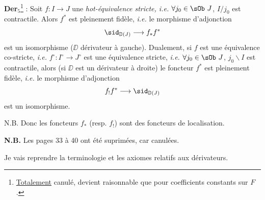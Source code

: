 \textbf{Der}$_5$\footnote[10]{\underline{Totalement} canulé, devient raisonnable que pour coefficients constants sur $F$.} : Soit $f : I \to J$ une \textit{hot-équivalence stricte, i.e.} $\forall j_0 \in \sOb\ J$, $I/j_0$ est contractile. Alors $f^*$ est pleinement fidèle, \textit{i.e.} le morphisme d'adjonction
\[ \sid_{\DD(J)} \longrightarrow f_* f^* \]
est un isomorphisme ($\DD$ dérivateur à gauche). Dualement, si $f$ est une équivalence co-stricte, \textit{i.e.} $f^\circ : I^\circ \to J^\circ$ est une équivalence stricte, \textit{i.e.} $\forall j_0 \in \sOb\ J$, $j_0 \backslash I$ est contractile, alors (si $\DD$ est un dérivateur à droite) le foncteur $f^*$ est pleinement fidèle, \textit{i.e.} le morphisme d'adjonction %
\[ f_! f^* \longrightarrow \sid_{\DD(J)} \]
est un isomorphisme.

N.B. Donc les foncteurs $f_*$ (resp. $f_!$) sont des foncteurs de localisation.

\textbf{N.B.} Les pages 33 à 40 ont été suprimées, car canulées. %

Je vais reprendre la terminologie et les axiomes relatifs aux dérivateurs.

